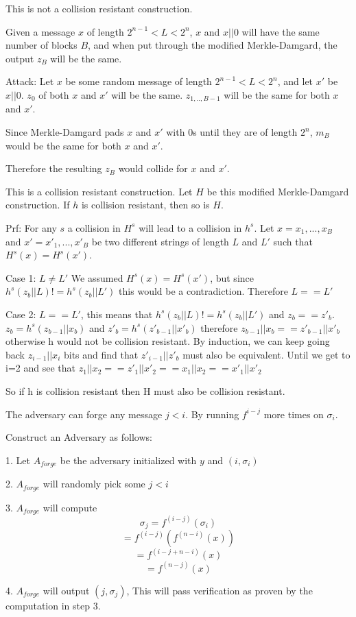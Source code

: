 \documentclass[12pt]{article}
\newenvironment{question}[2][Question]{\begin{trivlist}
		\item[\hskip \labelsep {\bfseries #1}\hskip \labelsep {\bfseries #2.}]}{\end{trivlist}}
\begin{document}
	\begin{question}{3}
		This is not a collision resistant construction.
		
		Given a message $x$ of length $2^{n-1}<L<2^n$, $x$ and $x||0$ will have the same number of blocks $B$, and when put through the modified Merkle-Damgard, the output $z_B$ will be the same. 
		
		
		Attack: Let $x$ be some random message of length $2^{n-1}<L<2^n$, and let $x'$ be $x||0$. 
		$z_0$ of both $x$ and $x'$ will be the same. $z_{1,..,{B-1}}$ will be the same for both $x$ and $x'$.
		
		Since Merkle-Damgard pads $x$ and $x'$ with 0s until they are of length $2^n$, $m_B$ would be the same for both $x$ and $x'$.
		
		Therefore the resulting $z_B$ would collide for $x$ and $x'$.
		
	\end{question}
	
	\begin{question}{4}
		This is a collision resistant construction. Let $H$ be this modified Merkle-Damgard construction. If $h$ is collision resistant, then so is $H$.
		
		Prf: For any $s$ a collision in $H^s$ will lead to a collision in $h^s$. Let $x= x_1,...,x_B$ and $x'=x'_1,...,x'_B$ be two different strings of length $L$ and $L'$ such that $H^s(x)= H^s(x')$. 
		
		Case 1: $L\neq L'$ We assumed $H^s(x) = H^s(x')$, but since $h^s(z_b||L) != h^s(z_b||L')$ this would be a contradiction. Therefore $L==L'$
		
		Case 2: $L==L'$, this means that $h^s(z_b||L) != h^s(z_b||L')$ and $z_b == z'_b$. $z_b = h^s(z_{b-1}||x_b)$ and $z'_b = h^s(z'_{b-1}||x'_b)$ therefore $z_{b-1}||x_b == z'_{b-1}||x'_b$ otherwise h would not be collision resistant. By induction, we can keep going back $z_{i-1}||x_i$ bits and find that $z'_{i-1}||z'_b$ must also be equivalent.
		Until we get to i=2 and see that $z_1||x_2 == z'_1||x'_2 == x_1||x_2 == x'_1||x'_2$
		
		
		So if h is collision resistant then H must also be collision resistant.
		
		
		
	\end{question}	
		
	\begin{question}{5}
		The adversary can forge any message $j<i$. By running $f^{i-j}$ more times on $\sigma_i$. 
		
		Construct an Adversary as follows:
		
		1. Let $A_{forge}$ be the adversary initialized with $y$ and $(i, \sigma_i)$
		
		2. $A_{forge}$ will randomly pick some $j<i$
		
		3. $A_{forge}$ will compute $$\sigma_j = f^{(i-j)}(\sigma_i)$$
		$$=f^{(i-j)}(f^{(n-i)}(x))$$
		$$=f^{(i-j+n-i)}(x)$$
		$$=f^{(n-j)}(x)$$
		
		4. $A_{forge}$ will output $(j, \sigma_j)$, This will pass verification as proven by the computation in step 3.
	\end{question}
	
\end{document}

